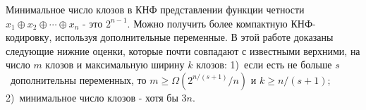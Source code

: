 
Минимальное число клозов в КНФ представлении функции четности
$x_1 \oplus x_2 \oplus \dotsb \oplus x_n$ - это $2^{n-1}$.
Можно получить более компактную КНФ-кодировку, используя дополнительные переменные.
В этой работе доказаны следующие нижние оценки,
которые почти совпадают с известными верхними,
на число $m$ клозов и максимальную ширину $k$ клозов:
1)~если есть не больше $s$~дополнительны переменных, то $m \ge \Omega\left(2^{n/(s+1)}/n\right)$ и $k \ge n/(s+1)$;
2)~минимальное число клозов - хотя бы $3n$.
